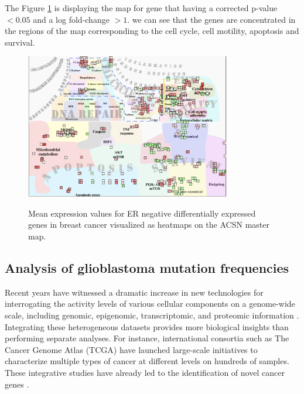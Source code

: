 The Figure \ref{fig:mainz} is displaying the map for gene that having a
corrected p-value $< 0.05$ and a log fold-change $>1$. we can see that the genes
are concentrated in the regions of the map corresponding to the cell cycle, cell
motility, apoptosis and survival.

\begin{figure}[!ht]
  \caption{Mean expression values for ER negative differentially expressed
  genes in breast cancer visualized as heatmaps on the ACSN master map.} 
  \centering
  \includegraphics[width=0.8\textwidth]{figures/mainz_acsn.pdf}
  \label{fig:mainz}
\end{figure}

\subsection{Analysis of glioblastoma mutation frequencies}

Recent years have witnessed a dramatic increase in new technologies for
interrogating the activity levels of various cellular components on a
genome-wide scale, including genomic, epigenomic, transcriptomic, and proteomic
information \citep{hawkins2010next}. Integrating these heterogeneous datasets
provides more biological insights than performing separate analyses. For
instance, international consortia such as The Cancer Genome Atlas (TCGA) have
launched large-scale initiatives to characterize multiple types of cancer at
different levels on hundreds of samples.  These integrative studies have
already led to the identification of novel cancer genes
\citep{mclendon2008comprehensive}. 

